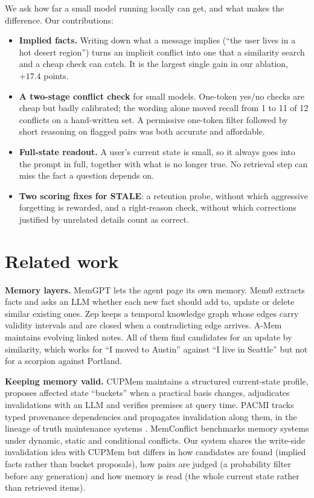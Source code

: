 \documentclass[10pt,twocolumn]{article}
\begin{document}
We ask how far a small model running locally can get, and what makes the difference. Our contributions:
\begin{itemize}
\item \textbf{Implied facts.} Writing down what a message implies (``the user lives in a hot desert region'') turns
an implicit conflict into one that a similarity search and a cheap check can catch. It is the largest single gain in
our ablation, $+17.4$ points.
\item \textbf{A two-stage conflict check} for small models. One-token yes/no checks are cheap but badly calibrated;
the wording alone moved recall from 1 to 11 of 12 conflicts on a hand-written set. A permissive one-token filter
followed by short reasoning on flagged pairs was both accurate and affordable.
\item \textbf{Full-state readout.} A user's current state is small, so it always goes into the prompt in full,
together with what is no longer true. No retrieval step can miss the fact a question depends on.
\item \textbf{Two scoring fixes for STALE}: a retention probe, without which aggressive forgetting is rewarded, and a
right-reason check, without which corrections justified by unrelated details count as correct.
\end{itemize}

\section{Related work}

\textbf{Memory layers.} MemGPT \cite{memgpt} lets the agent page its own memory. Mem0 \cite{mem0} extracts facts and
asks an LLM whether each new fact should add to, update or delete similar existing ones. Zep \cite{zep} keeps a
temporal knowledge graph whose edges carry validity intervals and are closed when a contradicting edge arrives.
A-Mem \cite{amem} maintains evolving linked notes. All of them find candidates for an update by similarity, which
works for ``I moved to Austin'' against ``I live in Seattle'' but not for a scorpion against Portland.

\textbf{Keeping memory valid.} CUPMem \cite{stale} maintains a structured current-state profile, proposes affected
state ``buckets'' when a practical basis changes, adjudicates invalidations with an LLM and verifies premises at query
time. PACMI \cite{pacmi} tracks typed provenance dependencies and propagates invalidation along them, in the lineage
of truth maintenance systems \cite{doyle}. MemConflict \cite{memconflict} benchmarks memory systems under dynamic,
static and conditional conflicts. Our system shares the write-side invalidation idea with CUPMem but differs in how
candidates are found (implied facts rather than bucket proposals), how pairs are judged (a probability filter before
any generation) and how memory is read (the whole current state rather than retrieved items).
\end{document}
